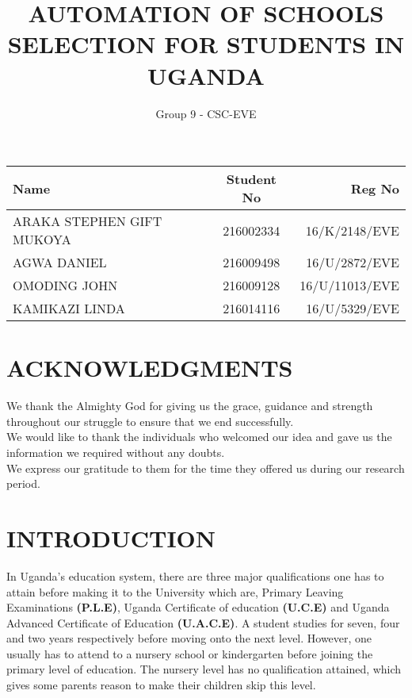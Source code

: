 \documentclass {article}
\begin{document}
\title {AUTOMATION OF SCHOOLS
SELECTION FOR STUDENTS
IN UGANDA}
\author {Group 9 - CSC-EVE}
\maketitle 

\begin{tabular}{||l||c||r||}
\hline
Name & Student No & Reg No\\
\hline
ARAKA STEPHEN GIFT MUKOYA & 216002334 & 16/K/2148/EVE\\
\hline
AGWA DANIEL & 216009498 & 16/U/2872/EVE\\
\hline
OMODING JOHN & 216009128 & 16/U/11013/EVE\\
\hline 
KAMIKAZI LINDA & 216014116 & 16/U/5329/EVE\\
\hline
\end{tabular}


\newpage

\section{ACKNOWLEDGMENTS}
We thank the Almighty God for giving us the grace, guidance and strength throughout our struggle to ensure that we end successfully.\\

We would like to thank the individuals who welcomed our idea and gave us the information we required without any doubts. \\

We express our gratitude to them for the time they offered us during our research period.\\
\newpage
\tableofcontents
\newpage

\section{INTRODUCTION}
In Uganda’s education system, there are three major qualifications one has to attain before making it to the University which are, Primary Leaving Examinations \textbf{(P.L.E)}, Uganda Certificate of education \textbf{(U.C.E)} and Uganda Advanced Certificate of Education \textbf{(U.A.C.E)}. A student studies for seven, four and two years respectively before moving onto the next level. However, one usually has to attend to a nursery school or kindergarten before joining the primary level of education. The nursery level has no qualification attained, which gives some parents reason to make their children skip this level. \\
\end{document}
